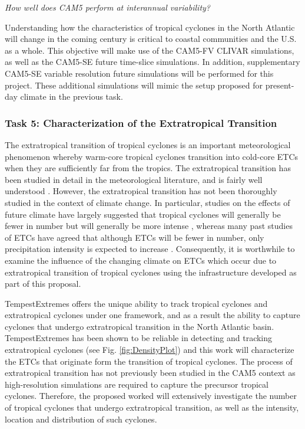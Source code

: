 \documentclass[11pt]{article}
\begin{document}
\emph{How well does CAM5 perform at interannual variability?}

Understanding how the characteristics of tropical cyclones in the North Atlantic will change in the coming century is critical to coastal communities and the U.S. as a whole. This objective will make use of the CAM5-FV CLIVAR simulations, as well as the CAM5-SE future time-slice simulations. In addition, supplementary CAM5-SE variable resolution future simulations will be performed for this project. These additional simulations will mimic the setup proposed for present-day climate in the previous task. 

\subsubsection{Task 5: Characterization of the Extratropical Transition}

The extratropical transition of tropical cyclones is an important meteorological phenomenon whereby warm-core tropical cyclones transition into cold-core ETCs when they are sufficiently far from the tropics.  The extratropical transition has been studied in detail in the meteorological literature, and is fairly well understood \citep{hart2001climatology}.  However, the extratropical transition has not been thoroughly studied in the context of climate change.  In particular, studies on the effects of future climate have largely suggested that tropical cyclones will generally be fewer in number but will generally be more intense \citep{Knutson2010}, whereas many past studies of ETCs have agreed that although ETCs will be fewer in number, only precipitation intensity is expected to increase \citep{bengtsson2009will}.  Consequently, it is worthwhile to examine the influence of the changing climate on ETCs which occur due to extratropical transition of tropical cyclones using the infrastructure developed as part of this proposal.

TempestExtremes offers the unique ability to track tropical cyclones and extratropical cyclones under one framework, and as a result the ability to capture cyclones that undergo extratropical transition in the North Atlantic basin.  TempestExtremes has been shown to be reliable in detecting and tracking extratropical cyclones (see Fig. \ref{fig:DensityPlot}) and this work will characterize the ETCs that originate form the transition of tropical cyclones. The process of extratropical transition has not previously been studied in the CAM5 context as high-resolution simulations are required to capture the precursor tropical cyclones. Therefore, the proposed worked will extensively investigate the number of tropical cyclones that undergo extratropical transition, as well as the intensity, location and distribution of such cyclones.  
\end{document}
